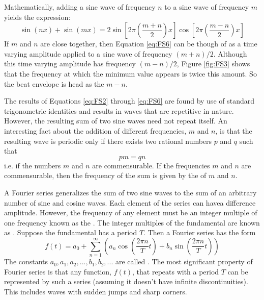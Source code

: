 Mathematically, adding a sine wave of frequency $n$ to a sine wave of frequency $m$ yields the expression: \begin{equation}\label{eq:FS6}
    \sin(nx) + \sin(mx) = 2\sin\left[2\pi\left(\frac{m+n}{2}\right)x\right]\cos\left[2\pi\left(\frac{m-n}{2}\right)x\right]
\end{equation}
If $m$ and $n$ are close together, then Equation \ref{eq:FS6} can be though of as a time varying amplitude applied to a sine wave of frequency $(m+n)/2$. Although this time varying amplitude has frequency $(m-n)/2$, Figure \ref{fig:FS3} shows that the frequency at which the minimum value appears is twice this amount. So the beat envelope is head as the $m-n$.

\noindent The results of Equations \ref{eq:FS2} through \ref{eq:FS6} are found by use of standard trigonometric identities and results in waves that are repetitive in nature. However, the resulting sum of two sine waves need not repeat itself. An interesting fact about the addition of different frequencies, $m$ and $n$, is that the resulting wave is periodic only if there exists two rational numbers $p$ and $q$ such that \begin{equation}\label{eq:FS7}
    pm = qn
\end{equation}
i.e. if the numbers $m$ and $n$ are commensurable. If the frequencies $m$ and $n$ are commensurable, then the frequency of the sum is given by the  of $m$ and $n$.

\noindent A Fourier series generalizes the sum of two sine waves to the sum of an arbitrary number of sine and cosine waves. Each element of the series can havea difference amplitude. However, the frequency of any element must be an integer multiple of one frequency known as the . The integer multiples of the fundamental are known as . Suppose the fundamental has a period $T$. Then a Fourier series has the form \begin{equation}\label{eq:FS8}
    f(t) = a_0 + \sum_{n=1}^{\infty}\left(a_n\cos\left(\frac{2\pi n}{T}t\right) + b_n\sin\left(\frac{2\pi n}{T}t\right)\right)
\end{equation}
The constants $a_0,a_1,a_2,...,b_1,b_2,...$ are called . The most significant property of Fourier series is that any function, $f(t)$, that repeats with a period $T$ can be represented by such a series (assuming it doesn't have infinite discontinuities). This includes waves with sudden jumps and sharp corners.

